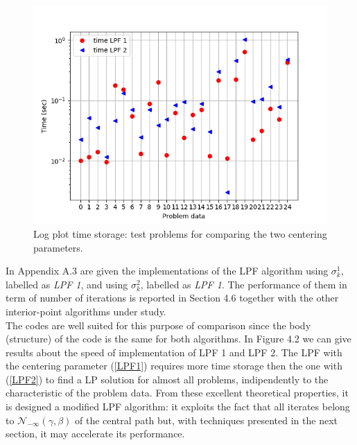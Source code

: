 \documentclass[a4paper,10 pt,titlepage,twoside]{report}
\theoremstyle{plain}
\theoremstyle{definition}
\theoremstyle{remark}
\begin{document}
\begin{figure}\label{fig:float}
\begin{center}
\includegraphics[width= 12 cm]{timeLPF12}\caption{Log plot time storage: test problems for comparing the two centering parameters.} 
\end{center}
\end{figure}
In Appendix A.3 are given the implementations of the LPF algorithm using $\sigma^{1}_{k}$, labelled as \textit{LPF 1}, and using $\sigma^{2}_{k}$, labelled as \textit{LPF 1}. The performance of them in term of number of iterations is reported in Section 4.6 together with the other interior-point algorithms under study.\\ The codes are well suited for this
purpose of comparison since the body (structure) of the code is the same for both algorithms. In Figure 4.2 we can give results about the speed of implementation of LPF 1 and LPF 2. The LPF with the centering parameter (\ref{LPF1}) requires more time storage then the one with (\ref{LPF2}) to find a LP solution for almost all problems, indipendently to the characteristic of the problem data. \newpage
From these excellent theoretical properties, it is designed a modified LPF algorithm: it exploits the fact that all iterates belong to $\mathcal{N}_{-\infty}(\gamma,\beta)$ of the central path but, with techniques presented in the next section, it may accelerate its performance. 
\end{document}
